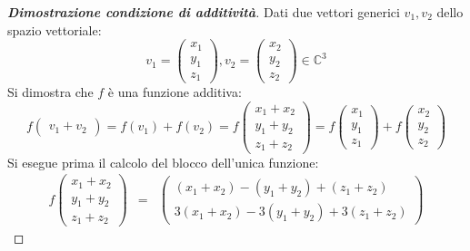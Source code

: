 \documentclass[a4paper]{article}
\begin{document}
	\begin{proof}[\textbf{Dimostrazione condizione di additività}]
		Dati due vettori generici $v_{1},v_{2}$ dello spazio vettoriale:
		\begin{equation*}
			v_{1} = \begin{pmatrix}
				x_{1} \\ y_{1} \\ z_{1}
			\end{pmatrix}, v_{2} = \begin{pmatrix}
				x_{2} \\ y_{2} \\ z_{2}
			\end{pmatrix} \in \mathbb{C}^{3}
		\end{equation*}
		Si dimostra che $f$ è una funzione additiva:
		\begin{equation*}
			f\begin{pmatrix}
				v_{1} + v_{2}
			\end{pmatrix} =
			f\left(v_{1}\right) + f\left(v_{2}\right) =
			f\begin{pmatrix}
				x_{1} + x_{2} \\
				y_{1} + y_{2} \\
				z_{1} + z_{2}
			\end{pmatrix} =
			f\begin{pmatrix}
				x_{1} \\ y_{1} \\ z_{1}
			\end{pmatrix} +
			f\begin{pmatrix}
				x_{2} \\ y_{2} \\ z_{2}
			\end{pmatrix}
		\end{equation*}
		Si esegue prima il calcolo del blocco dell'unica funzione:
		\begin{equation*}
			\begin{array}{rll}
				f\begin{pmatrix}
					x_{1} + x_{2} \\
					y_{1} + y_{2} \\
					z_{1} + z_{2}
				\end{pmatrix} &=&
				\begin{pmatrix}
					\left(x_{1} + x_{2}\right) - \left(y_{1} + y_{2}\right) + \left(z_{1} + z_{2}\right) \\
					3\left(x_{1}+x_{2}\right) - 3\left(y_{1}+y_{2}\right) + 3\left(z_{1}+z_{2}\right)
				\end{pmatrix}

\end{array}
\end{equation*}
\end{proof}
\end{document}

